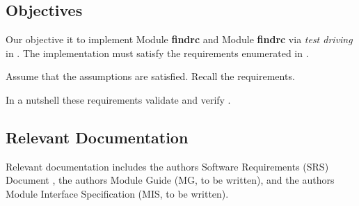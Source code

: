 \documentclass[12pt, titlepage]{article}
\begin{document}
\subsection{Objectives}

Our objective it to implement Module {\bf findrc} and Module {\bf findrc} via
{\it test driving} in \cpp. The implementation must satisfy the requirements
enumerated in \cite{SRS}.

Assume that the assumptions are satisfied. Recall the requirements.

%  
%  
%  
%  
%  
%  
%  
%  

In a nutshell these requirements validate and verify .

\subsection{Relevant Documentation}

Relevant documentation includes the authors Software Requirements (SRS) Document \cite{SRS}, the
authors Module Guide (MG, to be written), and the authors Module Interface Specification (MIS, to be written).
\end{document}
